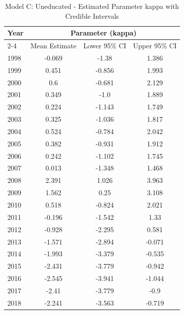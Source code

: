 \begin{landscape}
\begin{table}[htbp]
\centering
\caption{Model C: Uneducated - Estimated Parameter kappa  with Credible Intervals}
\label{tab:Fparameters_k9}
\begin{tabular}{@{}lccc@{}}
\toprule
Year & \multicolumn{3}{c}{Parameter (kappa)} \\
\cmidrule(lr){2-4}
      & Mean Estimate & Lower 95\% CI & Upper 95\% CI \\
\midrule
1998 & -0.069 & -1.38 & 1.386 \\
1999 & 0.451 & -0.856 & 1.993 \\
2000 & 0.6 & -0.681 & 2.129 \\
2001 & 0.349 & -1.0 & 1.889 \\
2002 & 0.224 & -1.143 & 1.749 \\
2003 & 0.325 & -1.036 & 1.817 \\
2004 & 0.524 & -0.784 & 2.042 \\
2005 & 0.382 & -0.931 & 1.912 \\
2006 & 0.242 & -1.102 & 1.745 \\
2007 & 0.013 & -1.348 & 1.468 \\
2008 & 2.391 & 1.026 & 3.963 \\
2009 & 1.562 & 0.25 & 3.108 \\
2010 & 0.518 & -0.824 & 2.021 \\
2011 & -0.196 & -1.542 & 1.33 \\
2012 & -0.928 & -2.295 & 0.581 \\
2013 & -1.571 & -2.894 & -0.071 \\
2014 & -1.993 & -3.379 & -0.535 \\
2015 & -2.431 & -3.779 & -0.942 \\
2016 & -2.545 & -3.941 & -1.044 \\
2017 & -2.41 & -3.779 & -0.9 \\
2018 & -2.241 & -3.563 & -0.719 \\
\bottomrule
\end{tabular}
\end{table}
\end{landscape}